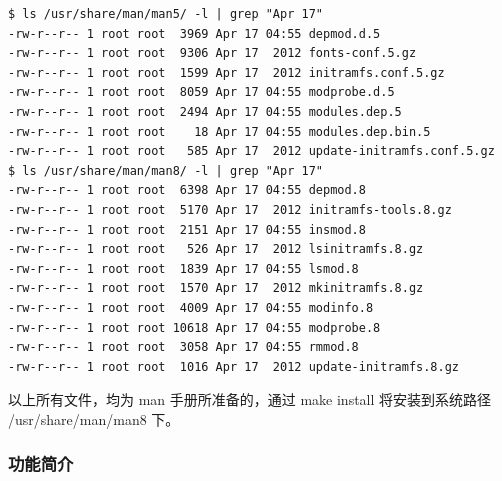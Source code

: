 \documentclass[11pt,a4paper]{article}
\begin{document}
{\begin{shaded}\begin{verbatim}
$ ls /usr/share/man/man5/ -l | grep "Apr 17"
-rw-r--r-- 1 root root  3969 Apr 17 04:55 depmod.d.5
-rw-r--r-- 1 root root  9306 Apr 17  2012 fonts-conf.5.gz
-rw-r--r-- 1 root root  1599 Apr 17  2012 initramfs.conf.5.gz
-rw-r--r-- 1 root root  8059 Apr 17 04:55 modprobe.d.5
-rw-r--r-- 1 root root  2494 Apr 17 04:55 modules.dep.5
-rw-r--r-- 1 root root    18 Apr 17 04:55 modules.dep.bin.5
-rw-r--r-- 1 root root   585 Apr 17  2012 update-initramfs.conf.5.gz
$ ls /usr/share/man/man8/ -l | grep "Apr 17"
-rw-r--r-- 1 root root  6398 Apr 17 04:55 depmod.8
-rw-r--r-- 1 root root  5170 Apr 17  2012 initramfs-tools.8.gz
-rw-r--r-- 1 root root  2151 Apr 17 04:55 insmod.8
-rw-r--r-- 1 root root   526 Apr 17  2012 lsinitramfs.8.gz
-rw-r--r-- 1 root root  1839 Apr 17 04:55 lsmod.8
-rw-r--r-- 1 root root  1570 Apr 17  2012 mkinitramfs.8.gz
-rw-r--r-- 1 root root  4009 Apr 17 04:55 modinfo.8
-rw-r--r-- 1 root root 10618 Apr 17 04:55 modprobe.8
-rw-r--r-- 1 root root  3058 Apr 17 04:55 rmmod.8
-rw-r--r-- 1 root root  1016 Apr 17  2012 update-initramfs.8.gz
\end{verbatim}\end{shaded}}
以上所有文件，均为 man 手册所准备的，通过 make install 将安装到系统路径
/usr/share/man/man8 下。

\subsubsection{功能简介}
\end{document}

